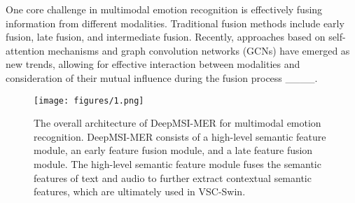 One core challenge in multimodal emotion recognition is effectively fusing information from different modalities. Traditional fusion methods include early fusion, late fusion, and intermediate fusion. Recently, approaches based on self-attention mechanisms and graph convolution networks (GCNs) have emerged as new trends, allowing for effective interaction between modalities and consideration of their mutual influence during the fusion process ____.

\begin{figure}[htbp]
	\centering
	\texttt{[image: figures/1.png]}
	\caption{The overall architecture of DeepMSI-MER for multimodal emotion recognition. DeepMSI-MER consists of a high-level semantic feature module, an early feature fusion module, and a late feature fusion module. The high-level semantic feature module fuses the semantic features of text and audio to further extract contextual semantic features, which are ultimately used in VSC-Swin.}
	\label{fig:fig1}
\end{figure}